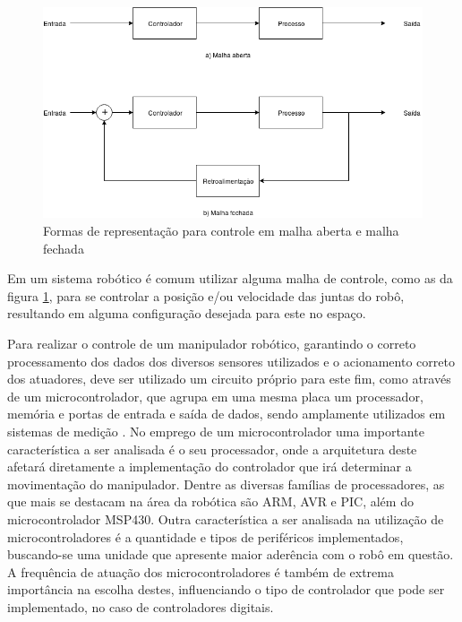\begin{figure}[h]
\caption{Formas de representação para controle em malha aberta e malha fechada}    
\begin{centering}
\includegraphics[width=0.8\columnwidth]{images/fundamentos/excontrole.png}
\par\end{centering}

\label{fig:excontrole}
\end{figure}

Em um sistema robótico é comum utilizar alguma malha de controle, como as da figura \ref{fig:excontrole}, para se controlar a posição e/ou velocidade
das juntas do robô, resultando em alguma configuração desejada para este no espaço. 

Para realizar o controle de um manipulador robótico, garantindo
o correto processamento dos dados dos diversos sensores utilizados e o 
acionamento correto dos atuadores, deve ser utilizado um circuito próprio para este fim, como através de um microcontrolador, que 
agrupa em uma mesma placa um processador, memória e portas de entrada e saída de dados, sendo amplamente utilizados em sistemas de medição \cite{bentley2005principles}.
No emprego de um microcontrolador uma importante característica a ser analisada é o seu processador, onde a arquitetura deste afetará
diretamente a implementação do controlador que irá determinar a movimentação do manipulador. Dentre as diversas famílias de processadores, as que mais se 
destacam na área da robótica são ARM, AVR e PIC, além do microcontrolador MSP430. Outra característica a ser analisada na utilização de microcontroladores é 
a quantidade e tipos de periféricos implementados, buscando-se uma unidade que apresente maior aderência com o robô em questão. A frequência de atuação dos
microcontroladores é também de extrema importância na escolha destes, influenciando o tipo de controlador que pode ser implementado, no caso de controladores
digitais.

